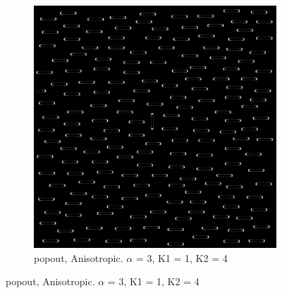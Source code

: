\begin{figure}[H]
\centering 
  \begin{subfigure}{.7\textwidth}
    \centering
    \includegraphics[width=.9\textwidth]{./canny/popout_ANISO_a3_k11_k24}
    \caption{popout, Anisotropic. $\alpha$ = 3, K1 = 1, K2 = 4}
    \label{fig:popout_ANISO_a3_k11_k24}
  \end{subfigure}%
  
\end{figure}